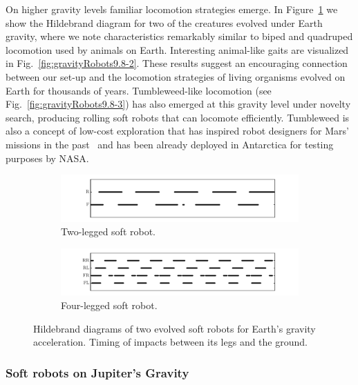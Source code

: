 \documentclass{sig-alternate}
\begin{document}
On higher gravity levels familiar locomotion strategies emerge. In Figure~\ref{fig:hildebrand} we show the Hildebrand diagram for two of the creatures evolved under Earth gravity, where we note characteristics remarkably similar to biped and quadruped locomotion used by animals on Earth. Interesting animal-like gaits are visualized in Fig.~\ref{fig:gravityRobots9.8-2}. These results suggest an encouraging connection between our set-up and the locomotion strategies of living organisms evolved on Earth for thousands of years. Tumbleweed-like locomotion (see Fig.~\ref{fig:gravityRobots9.8-3}) has also emerged at this gravity level under novelty search, producing rolling soft robots that can locomote efficiently. 
Tumbleweed is also a concept of low-cost exploration that has inspired robot designers for Mars' missions in the past~\cite{antol2003low} and has been already deployed in Antarctica for testing purposes by NASA.

\begin{figure}[b!]
\centering
\begin{subfigure}[b]{0.5\textwidth}
\centering
\includegraphics[width=1.0\textwidth]{../Figures/Results/hildebrand1.pdf}
\caption{Two-legged soft robot.}
\end{subfigure}
\begin{subfigure}[b]{0.5\textwidth}
\centering
\includegraphics[width=1.0\textwidth]{../Figures/Results/hildebrand2.pdf}
\caption{Four-legged soft robot.}
\end{subfigure}
\caption{Hildebrand diagrams of two evolved soft robots for Earth's gravity acceleration. Timing of impacts between its legs and the ground.}
\label{fig:hildebrand}
\end{figure}


\subsubsection*{Soft robots on Jupiter's Gravity}
\end{document}

